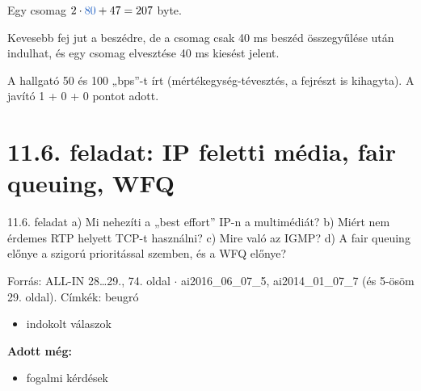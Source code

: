 Egy csomag $2\cdot{\ca{80}}+47=207$ byte.

\begin{center}\end{center}

Kevesebb fej jut a beszédre, de a csomag csak 40 ms beszéd összegyűlése után indulhat, és egy csomag elvesztése 40 ms kiesést jelent.

\begin{center}\end{center}
\begin{figyelem}[Javítás]
A hallgató 50 és 100 „bps”-t írt (mértékegység-tévesztés, a fejrészt is kihagyta). A javító 1 + 0 + 0 pontot adott.
\end{figyelem}
\begin{eredmeny}

\begin{center}\end{center}
\end{eredmeny}


\section{\texorpdfstring{11.6. feladat: IP feletti média, fair queuing, WFQ}{11.6. feladat: IP feletti média, fair queuing, WFQ}}\label{ai11_06}
\setcounter{lepes}{0}
\begin{feladat}{11.6. feladat}
a) Mi nehezíti a „best effort” IP-n a multimédiát? b) Miért nem érdemes RTP helyett TCP-t használni? c) Mire való az IGMP? d) A fair queuing előnye a szigorú prioritással szemben, és a WFQ előnye?

{\footnotesize\sffamily Forrás: ALL-IN 28\ldots{}29., 74. oldal $\cdot$ ai2016\_06\_07\_5, ai2014\_01\_07\_7 (és 5-ösöm 29. oldal). Címkék: beugró}
\end{feladat}
\begin{keresunk}
\begin{itemize}
\item indokolt válaszok
\end{itemize}
\end{keresunk}
\begin{jeloles}
\par\smallskip\textbf{Adott még:}
\begin{itemize}
\item fogalmi kérdések
\end{itemize}
\end{jeloles}

